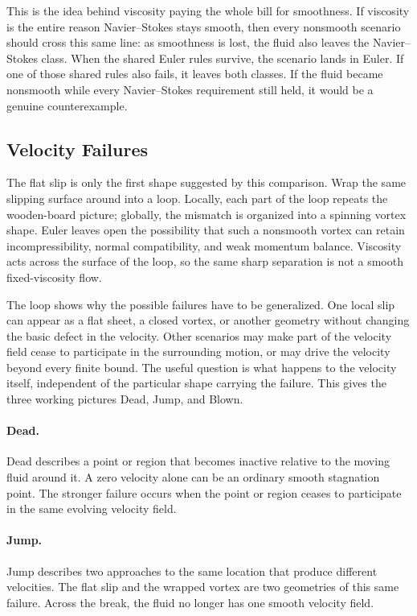 This is the idea behind viscosity paying the whole bill for smoothness.
If viscosity is the entire reason Navier--Stokes stays smooth, then every nonsmooth scenario should cross this same line: as smoothness is lost, the fluid also leaves the Navier--Stokes class.
When the shared Euler rules survive, the scenario lands in Euler.
If one of those shared rules also fails, it leaves both classes.
If the fluid became nonsmooth while every Navier--Stokes requirement still held, it would be a genuine counterexample.

\subsection{Velocity Failures}

The flat slip is only the first shape suggested by this comparison.
Wrap the same slipping surface around into a loop.
Locally, each part of the loop repeats the wooden-board picture; globally, the mismatch is organized into a spinning vortex shape.
Euler leaves open the possibility that such a nonsmooth vortex can retain incompressibility, normal compatibility, and weak momentum balance.
Viscosity acts across the surface of the loop, so the same sharp separation is not a smooth fixed-viscosity flow.

The loop shows why the possible failures have to be generalized.
One local slip can appear as a flat sheet, a closed vortex, or another geometry without changing the basic defect in the velocity.
Other scenarios may make part of the velocity field cease to participate in the surrounding motion, or may drive the velocity beyond every finite bound.
The useful question is what happens to the velocity itself, independent of the particular shape carrying the failure.
This gives the three working pictures Dead, Jump, and Blown.

\paragraph{Dead.}
Dead describes a point or region that becomes inactive relative to the moving fluid around it.
A zero velocity alone can be an ordinary smooth stagnation point.
The stronger failure occurs when the point or region ceases to participate in the same evolving velocity field.

\paragraph{Jump.}
Jump describes two approaches to the same location that produce different velocities.
The flat slip and the wrapped vortex are two geometries of this same failure.
Across the break, the fluid no longer has one smooth velocity field.

